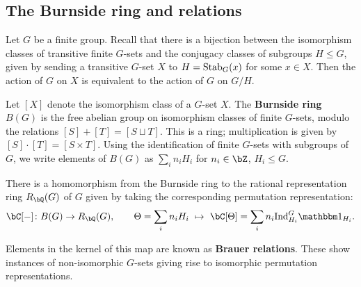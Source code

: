 

\subsection{The Burnside ring and relations}

Let $G$ be a finite group. Recall that there is a bijection between the isomorphism classes of transitive finite $G$-sets and the conjugacy classes of subgroups $H \leq G$, given by sending a transitive $G$-set $X$ to $H = \mathrm{Stab}_{G}(x)$ for some $x \in X$. Then the action of $G$ on $X$ is equivalent to the action of $G$ on $G / H$. 

\begin{defn}
Let $[X]$ denote the isomorphism class of a $G$-set $X$. 
The \textbf{Burnside ring} $B(G)$ is the free abelian group on isomorphism classes of finite $G$-sets, modulo the relations  $[S] + [T] = [S \sqcup T]$. This is a ring; multiplication is given by $[S] \cdot [T] = [S \times T]$. Using the identification of finite $G$-sets with subgroups of $G$, we write elements of $B(G)$ as $\sum_i n_i H_i$ for $n_i \in \bZ$, $H_i \leq G$. 
\end{defn}

\begin{notn}
There is a homomorphism from the Burnside ring to the rational representation ring $R_{\bQ}(G)$ of $G$ given by taking the corresponding permutation representation:
\[ \bC[-] \colon B(G) \to R_{\bQ}(G),  \qquad \Theta = \sum_i n_i H_i \ \mapsto \ \bC[\Theta ] = \sum_i n_i \Ind_{H_i}^G \trivial_{H_i}. \]
\end{notn}
Elements in the kernel of this map are known as \textbf{Brauer relations}. These show instances of non-isomorphic $G$-sets giving rise to isomorphic permutation representations. 

